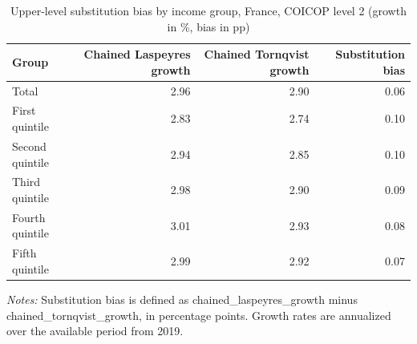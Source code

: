 \begin{table}[H]
\centering
\caption{Upper-level substitution bias by income group, France, COICOP level 2 (growth in \%, bias in pp)}
\label{tab:fr-substitution-bias-level2}
\begin{tabular}{lrrr}
\toprule
Group & Chained Laspeyres growth & Chained Tornqvist growth & Substitution bias \\
\midrule
Total & 2.96 & 2.90 & 0.06 \\
First quintile & 2.83 & 2.74 & 0.10 \\
Second quintile & 2.94 & 2.85 & 0.10 \\
Third quintile & 2.98 & 2.90 & 0.09 \\
Fourth quintile & 3.01 & 2.93 & 0.08 \\
Fifth quintile & 2.99 & 2.92 & 0.07 \\
\bottomrule
\end{tabular}
\begin{flushleft}
\footnotesize{\emph{Notes:} Substitution bias is defined as chained\_laspeyres\_growth minus chained\_tornqvist\_growth, in percentage points. Growth rates are annualized over the available period from 2019.}
\end{flushleft}
\end{table}
